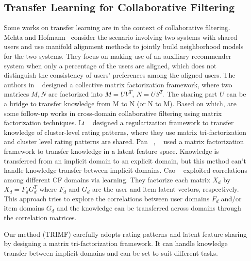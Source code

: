 \subsection{Transfer Learning for Collaborative Filtering}
Some works on transfer learning are in the context of collaborative filtering.
Mehta and Hofmann~\cite{/ki/bhaskar06cross} consider the scenario involving two systems with shared users and use manifold alignment methods to jointly build neighborhood models for the two systems. They focus on making use of an auxiliary recommender system when only a percentage of the users are aligned, which does not distinguish the consistency of users' preferences among the aligned users.
The authors in ~\cite{/kdd/SinghG08} designed a collective matrix factorization framework, where two matrices $M, N$ are factorized into $M = UV^T$, $N = US^T$. The sharing part $U$ can be a bridge to transfer knowledge from M to N (or N to M). Based on which, are some follow-up works in cross-domain collaborative filtering using matrix factorization techniques.
Li \etal~\cite{/icml/libin09} designed a regularization framework to transfer knowledge of cluster-level rating patterns, where they use matrix tri-factorization and cluster level rating patterns are shared.
Pan \etal~\cite{/ijcai/PanLXY11}, ~\cite{AAAI101649} used a matrix factorization framework to transfer knowledge in a latent feature space. Knowledge is transferred from an implicit domain to an explicit domain, but this method can’t handle knowledge transfer between implicit domains.
Cao \etal~\cite{cao2010transfer} exploited correlations among different CF domains via learning. They factorize each matrix $X_d$ by $X_d = F_d G_d^T$ where $F_d$ and $G_d$ are the user and item latent vectors, respectively. This approach tries to explore the correlations between user domains {$F_d$} and/or item domains {$G_d$} and the knowledge can be
transferred across domains through the correlation matrices.

Our method (TRIMF) carefully adopts rating patterns and latent feature sharing by designing a matrix tri-factorization framework. It can handle knowledge transfer between implicit domains and can be set to suit different tasks.

\hspace{0.05in}

